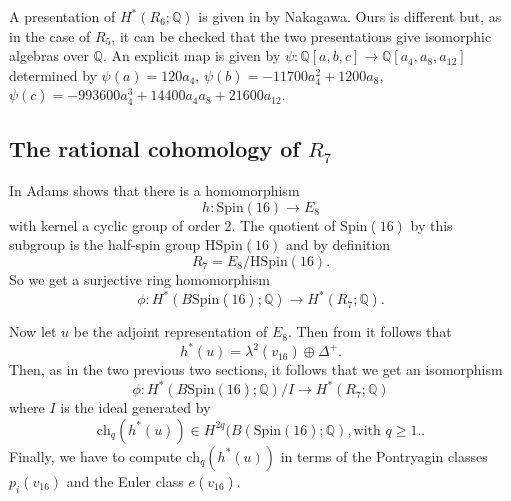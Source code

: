 \documentclass[twoside,a4paper,reqno,11pt]{amsart}
\newcommand{\Q}{\mathbb{Q}}
\newcommand{\Spin}{\mathrm{Spin}}
\newcommand{\HSpin}{\mathrm{HSpin}}
\newcommand{\ch}{\mathrm{ch}}
\begin{document}
A presentation of $H^*(R_6; \Q)$ is given in \cite[Lemma~2.4(ii)]{MR1878720} by Nakagawa. Ours is different but, as in the case of $R_5$, it can be checked that the two presentations give isomorphic algebras over $\Q$. An explicit map is given by $\psi: \Q[a,b,c] \rightarrow \Q[a_4,a_8,a_{12}]$ determined by $\psi(a) = 120a_4$, $\psi(b) =  -11700a_4^2 + 1200a_8$, $\psi(c) = -993600a_4^3 + 14400a_4a_8 + 21600a_{12}$.

\subsection{The rational cohomology of $R_7$}

In \cite[Chapter 7]{MR1428422} Adams shows that there is a homomorphism 
$$
h : \Spin(16) \to E_8
$$
with kernel a cyclic group of order 2. The quotient of $\Spin(16)$ by this subgroup is the half-spin group $\HSpin(16)$ and by definition
\[
R_7 = E_8/\HSpin(16).
\]
So we get a surjective ring homomorphism
$$
\phi : H^*(B\Spin(16); \Q) \to H^*(R_7; \Q).
$$

Now let $u$ be the adjoint representation of $E_8$.  Then from \cite[Chapter 7]{MR1428422} it follows that
$$
h^*(u) = \lambda^2(v_{16}) \oplus \Delta^+.
$$
Then, as in the two previous two sections, it follows that we get an isomorphism
$$
\phi : H^*(B\Spin(16); \Q)/I \to H^*(R_7; \Q) 
$$
where $I$ is the ideal generated by
$$
\ch_q(h^*(u)) \in H^{2q}(B(\Spin(16); \Q), \text{with $q \geq 1$.}. 
$$
Finally, we have to compute $\ch_q(h^*(u))$ in terms of the Pontryagin classes $p_i(v_{16})$ and the Euler class $e(v_{16})$.
\end{document}
